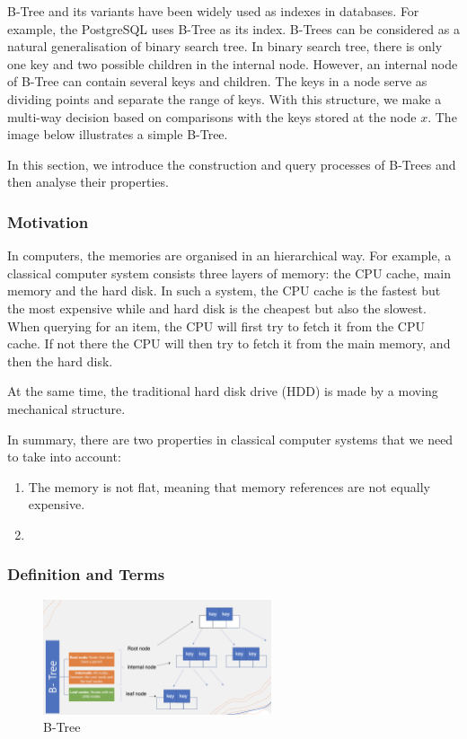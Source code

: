 B-Tree and its variants have been widely used as indexes in
databases. For example, the PostgreSQL uses B-Tree as its index. B-Trees
can be considered as a natural generalisation of binary search tree. In
binary search tree, there is only one key and two possible children in
the internal node. However, an internal node of B-Tree can contain
several keys and children. The keys in a node serve as dividing points
and separate the range of keys. With this structure, we make a
multi-way decision based on comparisons with the keys stored at the node
$x$. The image below illustrates a simple B-Tree.

In this section, we introduce the construction and query processes
of B-Trees and then analyse their properties.

\subsubsection{Motivation}

In computers, the memories are organised in an hierarchical way. For example, a classical computer system consists three layers of memory: the CPU cache, main memory and the hard disk. In such a system, the CPU cache is the fastest but the most expensive while and hard disk is the cheapest but also the slowest. When querying for an item, the CPU will first try to fetch it from the CPU cache. If not there the CPU will then try to fetch it from the main memory, and then the hard disk.


At the same time, the traditional hard disk drive (HDD) is made by a moving mechanical structure.


In summary, there are two properties in classical computer systems that we need to take into account:

\begin{enumerate}
	\item The memory is not flat, meaning that memory references are not equally expensive. 
	\item 
\end{enumerate}

\subsubsection{Definition and Terms}
\begin{figure}[htp]
    \centering
    \includegraphics[width=0.6\textwidth]{graphs/B-Tree_definitions.png}
    \caption{B-Tree}
    \label{fig:B-Tree}
\end{figure}

